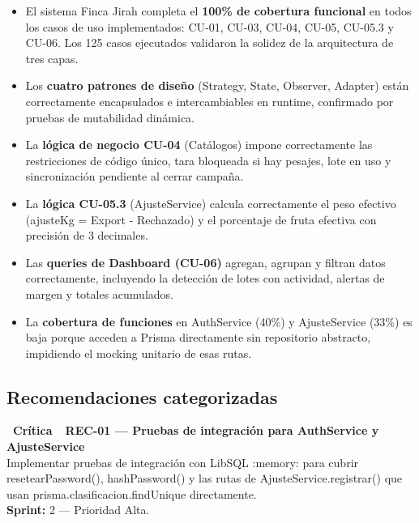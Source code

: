 \documentclass[12pt, a4paper]{article}
\newcommand{\badgeCritical}{\colorbox{CDangerBg}{\color{CDanger}\small\bfseries\ Crítica\ }}
\newcommand{\code}[1]{\colorbox{CCodeBg}{\color{CCode}\ttfamily\small #1}}
\begin{document}
\begin{itemize}[leftmargin=1.5em, itemsep=6pt]
  \item[\textcolor{CSuccess}{\faCheckCircle}] El sistema Finca Jirah completa el \textbf{100\% de cobertura funcional} en todos los casos de uso implementados: CU-01, CU-03, CU-04, CU-05, CU-05.3 y CU-06. Los 125 casos ejecutados validaron la solidez de la arquitectura de tres capas.

  \item[\textcolor{CSuccess}{\faCheckCircle}] Los \textbf{cuatro patrones de diseño} (Strategy, State, Observer, Adapter) están correctamente encapsulados e intercambiables en runtime, confirmado por pruebas de mutabilidad dinámica.

  \item[\textcolor{CSuccess}{\faCheckCircle}] La \textbf{lógica de negocio CU-04} (Catálogos) impone correctamente las restricciones de código único, tara bloqueada si hay pesajes, lote en uso y sincronización pendiente al cerrar campaña.

  \item[\textcolor{CSuccess}{\faCheckCircle}] La \textbf{lógica CU-05.3} (AjusteService) calcula correctamente el peso efectivo (\code{ajusteKg = Export - Rechazado}) y el porcentaje de fruta efectiva con precisión de 3 decimales.

  \item[\textcolor{CSuccess}{\faCheckCircle}] Las \textbf{queries de Dashboard (CU-06)} agregan, agrupan y filtran datos correctamente, incluyendo la detección de lotes con actividad, alertas de margen y totales acumulados.

  \item[\textcolor{CWarning}{\faExclamationCircle}] La \textbf{cobertura de funciones} en \code{AuthService} (40\%) y \code{AjusteService} (33\%) es baja porque acceden a Prisma directamente sin repositorio abstracto, impidiendo el mocking unitario de esas rutas.
\end{itemize}

\subsection{Recomendaciones categorizadas}

\vspace{6pt}
\begin{defectcritical}
\textbf{\badgeCritical\ REC-01 --- Pruebas de integración para AuthService y AjusteService}\\[4pt]
Implementar pruebas de integración con LibSQL \code{:memory:} para cubrir \code{resetearPassword()}, \code{hashPassword()} y las rutas de \code{AjusteService.registrar()} que usan \code{prisma.clasificacion.findUnique} directamente.\\[4pt]
\textbf{Sprint:} 2 --- Prioridad Alta.
\end{defectcritical}
\end{document}
